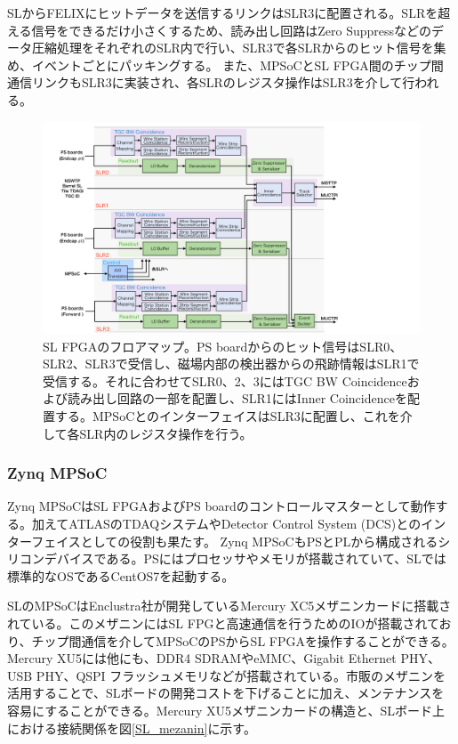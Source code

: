 SLからFELIXにヒットデータを送信するリンクはSLR3に配置される。SLRを超える信号をできるだけ小さくするため、読み出し回路はZero Suppressなどのデータ圧縮処理をそれぞれのSLR内で行い、SLR3で各SLRからのヒット信号を集め、イベントごとにパッキングする。
また、MPSoCとSL FPGA間のチップ間通信リンクもSLR3に実装され、各SLRのレジスタ操作はSLR3を介して行われる。

\begin{figure} 
\centering
\includegraphics[width=16cm]{fig/Intro/SL_floor.pdf}
\caption[SL FPGAのフロアマップ]{SL FPGAのフロアマップ。PS boardからのヒット信号はSLR0、SLR2、SLR3で受信し、磁場内部の検出器からの飛跡情報はSLR1で受信する。それに合わせてSLR0、2、3にはTGC BW Coincidenceおよび読み出し回路の一部を配置し、SLR1にはInner Coincidenceを配置する。MPSoCとのインターフェイスはSLR3に配置し、これを介して各SLR内のレジスタ操作を行う。}
\label{SL_floor}
\end{figure}



    \subsubsection*{Zynq MPSoC}
Zynq MPSoCはSL FPGAおよびPS boardのコントロールマスターとして動作する。加えてATLASのTDAQシステムやDetector Control System (DCS)とのインターフェイスとしての役割も果たす。
Zynq MPSoCもPSとPLから構成されるシリコンデバイスである。PSにはプロセッサやメモリが搭載されていて、SLでは標準的なOSであるCentOS7を起動する。

SLのMPSoCはEnclustra社が開発しているMercury XC5メザニンカードに搭載されている。このメザニンにはSL FPGと高速通信を行うためのIOが搭載されており、チップ間通信を介してMPSoCのPSからSL FPGAを操作することができる。Mercury XU5には他にも、DDR4 SDRAMやeMMC、Gigabit Ethernet PHY、USB PHY、QSPI フラッシュメモリなどが搭載されている。市販のメザニンを活用することで、SLボードの開発コストを下げることに加え、メンテナンスを容易にすることができる。Mercury XU5メザニンカードの構造と、SLボード上における接続関係を図\ref{SL_mezanin}に示す。


